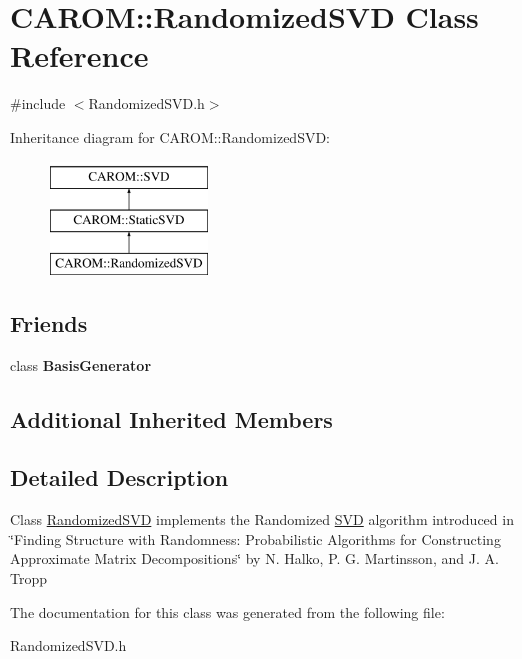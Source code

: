 \hypertarget{class_c_a_r_o_m_1_1_randomized_s_v_d}{\section{C\-A\-R\-O\-M\-:\-:Randomized\-S\-V\-D Class Reference}
\label{class_c_a_r_o_m_1_1_randomized_s_v_d}
}


{\ttfamily \#include $<$Randomized\-S\-V\-D.\-h$>$}

Inheritance diagram for C\-A\-R\-O\-M\-:\-:Randomized\-S\-V\-D\-:\begin{figure}[H]
\begin{center}
\leavevmode
\includegraphics[height=3.000000cm]{class_c_a_r_o_m_1_1_randomized_s_v_d}
\end{center}
\end{figure}
\subsection*{Friends}
\begin{DoxyCompactItemize}
\item 
\hypertarget{class_c_a_r_o_m_1_1_randomized_s_v_d_a14677f178902af98cccb02b0058fd326}{class {\bfseries Basis\-Generator}}\label{class_c_a_r_o_m_1_1_randomized_s_v_d_a14677f178902af98cccb02b0058fd326}

\end{DoxyCompactItemize}
\subsection*{Additional Inherited Members}


\subsection{Detailed Description}
Class \hyperlink{class_c_a_r_o_m_1_1_randomized_s_v_d}{Randomized\-S\-V\-D} implements the Randomized \hyperlink{class_c_a_r_o_m_1_1_s_v_d}{S\-V\-D} algorithm introduced in \char`\"{}\-Finding Structure with Randomness\-: Probabilistic Algorithms for
   Constructing Approximate Matrix Decompositions\char`\"{} by N. Halko, P. G. Martinsson, and J. A. Tropp 

The documentation for this class was generated from the following file\-:\begin{DoxyCompactItemize}
\item 
Randomized\-S\-V\-D.\-h\end{DoxyCompactItemize}
